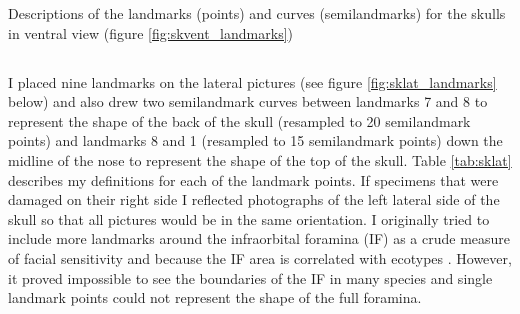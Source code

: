 \bigskip

\begin{table}[!htb] %
\caption[Skulls: ventral landmarks]
		{Descriptions of the landmarks (points) and curves (semilandmarks) for the skulls in ventral view (figure \ref{fig:skvent_landmarks})} 

\label{tab:skvent}
\end{table}
\newpage
\subsection{}
	I placed nine landmarks on the lateral pictures (see figure \ref{fig:sklat_landmarks} below) and also drew two semilandmark curves between landmarks 7 and 8 to represent the shape of the back of the skull (resampled to 20 semilandmark points) and landmarks 8 and 1 (resampled to 15 semilandmark points) down the midline of the nose to represent the shape of the top of the skull. Table \ref{tab:sklat} describes my definitions for each of the landmark points.
	If specimens that were damaged on their right side I reflected photographs of the left lateral side of the skull so that all pictures would be in the same orientation.
	I originally tried to include more landmarks around the infraorbital foramina (IF) as a crude measure of facial sensitivity and because the IF area is correlated with ecotypes \citep{Crumpton2012}. However, it proved impossible to see the boundaries of the IF in many species and single landmark points could not represent the shape of the full foramina. 

